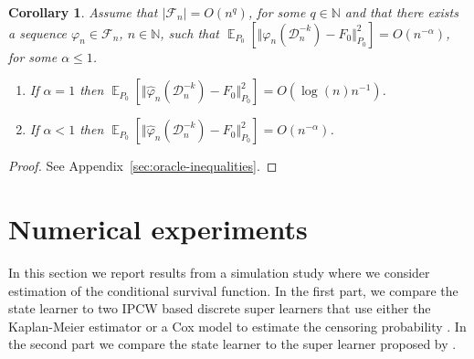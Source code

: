 \documentclass[a4paper,danish]{article}
\theoremstyle{plain} %
\numberwithin{theorem}{section}
\newtheorem{corollary}[theorem]{Corollary}
\theoremstyle{definition} %
\theoremstyle{remark}
\DeclareMathOperator{\E}{\mathbb{E}} %
\newcommand{\N}{\mathbb{N}}
\renewcommand{\phi}{\varphi}
\newcommand\bigO{\textit{O}}
\newcommand{\1}{\mathds{1}}
\newcommand{\data}{\ensuremath{\mathcal{D}}}
\begin{document}
\begin{corollary}
  \label{cor:asymp-cons}
  Assume that \( |\mathcal{F}_n| = \bigO(n^q)\), for some \( q \in \N \) and
  that there exists a sequence \( \phi_n \in \mathcal{F}_n \), \( n \in \N \),
  such that
  \( \E_{P_0}{\left[ \Vert \phi_n(\data_n^{-k}) - F_{0} \Vert_{P_0}^2 \right]} =
  \bigO(n^{-\alpha}) \), for some \( \alpha\leq 1 \).
  \begin{enumerate}[label=(\alph*)]
  \item If $\alpha=1$ then
    \( \E_{P_0}{\left[ \Vert \hat{\phi}_n(\data_n^{-k}) - F_0 \Vert_{P_0}^2
      \right]} = \bigO(\log(n)n^{-1}) \).
  \item If $\alpha<1$ then
    \( \E_{P_0}{\left[ \Vert \hat{\phi}_n(\data_n^{-k}) - F_0 \Vert_{P_0}^2 \right]} =
    \bigO(n^{-\alpha}) \).
  \end{enumerate}
\end{corollary}
\begin{proof}
  See Appendix~\ref{sec:oracle-inequalities}.
\end{proof}




\section{Numerical experiments}
\label{sec:numer-exper}


In this section we report results from a simulation study where we consider
estimation of the conditional survival function. In the first part, we compare
the state learner to two IPCW based discrete super learners that use either the
Kaplan-Meier estimator or a Cox model to estimate the censoring probability
\citep{gonzalez2021stacked}. In the second part we compare the state learner to
the super learner proposed by \cite{westling2021inference}.
\end{document}
